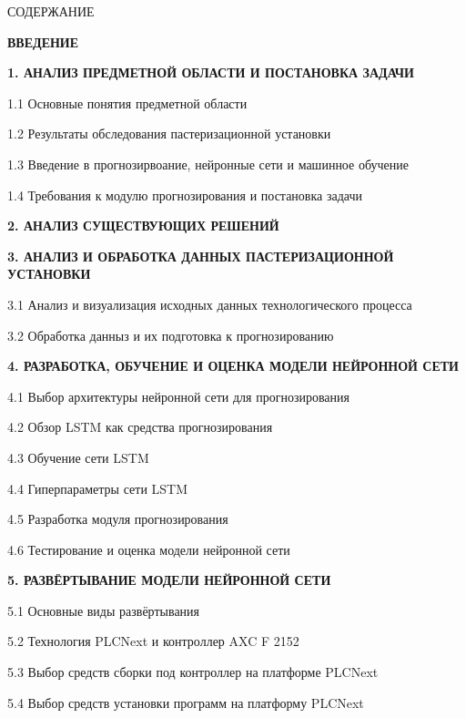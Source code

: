 {\gostTitleFont
    \redline
    СОДЕРЖАНИЕ
} 

\titlespace

{\gostFont
    \par
    \par {\bfseries ВВЕДЕНИЕ }
    \par {\bfseries 1. АНАЛИЗ ПРЕДМЕТНОЙ ОБЛАСТИ И ПОСТАНОВКА ЗАДАЧИ }
    \par 1.1 Основные понятия предметной области 
    \par 1.2 Результаты обследования пастеризационной установки  
    \par 1.3 Введение в прогнозирвоание, нейронные сети и машинное обучение  
    \par 1.4 Требования к модулю прогнозирования и постановка задачи  
    \par {\bfseries 2. АНАЛИЗ СУЩЕСТВУЮЩИХ РЕШЕНИЙ }
    \par {\bfseries 3. АНАЛИЗ И ОБРАБОТКА ДАННЫХ ПАСТЕРИЗАЦИОННОЙ УСТАНОВКИ }
    \par 3.1 Анализ и визуализация исходных данных технологического процесса 
    \par 3.2 Обработка данныз и их подготовка к прогнозированию 
    \par {\bfseries 4. РАЗРАБОТКА, ОБУЧЕНИЕ И ОЦЕНКА МОДЕЛИ НЕЙРОННОЙ СЕТИ}
    \par 4.1 Выбор архитектуры нейронной сети для прогнозирования 
    \par 4.2 Обзор LSTM как средства прогнозирования 
    \par 4.3 Обучение сети LSTM 
    \par 4.4 Гиперпараметры сети LSTM 
    \par 4.5 Разработка модуля прогнозирования 
    \par 4.6 Тестирование и оценка модели нейронной сети 
    \par {\bfseries 5. РАЗВЁРТЫВАНИЕ МОДЕЛИ НЕЙРОННОЙ СЕТИ }
    \par 5.1 Основные виды развёртывания 
    \par 5.2 Технология PLCNext и контроллер AXC F 2152 
    \par 5.3 Выбор средств сборки под контроллер на платформе PLCNext 
    \par 5.4 Выбор средств установки программ на платформу PLCNext 
}
